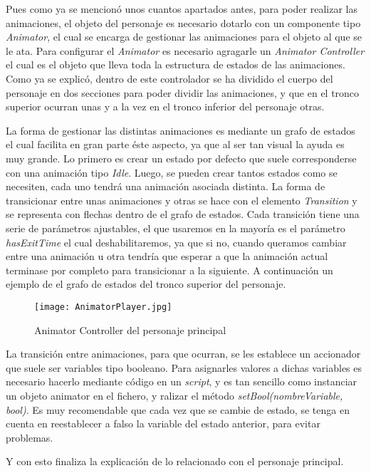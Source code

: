 Pues como ya se mencionó unos cuantos apartados antes, para poder realizar las animaciones, el objeto del personaje es necesario dotarlo con un componente tipo \textit{Animator}, el cual se encarga de gestionar las animaciones para el objeto al que se le ata. Para configurar el \textit{Animator} es necesario agragarle un \textit{Animator Controller} el cual es el objeto que lleva toda la estructura de estados de las animaciones. Como ya se explicó, dentro de este controlador se ha dividido el cuerpo del personaje en dos secciones para poder dividir las animaciones, y que en el tronco superior ocurran unas y a la vez en el tronco inferior del personaje otras.

La forma de gestionar las distintas animaciones es mediante un grafo de estados el cual facilita en gran parte éste aspecto, ya que al ser tan visual la ayuda es muy grande. Lo primero es crear un estado por defecto que suele corresponderse con una animación tipo \textit{Idle}. Luego, se pueden crear tantos estados como se necesiten, cada uno tendrá una animación asociada distinta. La forma de transicionar entre unas animaciones y otras se hace con el elemento \textit{Transition} y se representa con flechas dentro de el grafo de estados. Cada transición tiene una serie de parámetros ajustables, el que usaremos en la mayoría es el parámetro \textit{hasExitTime} el cual deshabilitaremos, ya que si no, cuando queramos cambiar entre una animación u otra tendría que esperar a que la animación actual terminase por completo para transicionar a la siguiente. A continuación un ejemplo de el grafo de estados del tronco superior del personaje.

\begin{figure}[H]
    \centering
    \texttt{[image: AnimatorPlayer.jpg]}
    \caption{Animator Controller del personaje principal}
\end{figure}

La transición entre animaciones, para que ocurran, se les establece un accionador que suele ser variables tipo booleano. Para asignarles valores a dichas variables es necesario hacerlo mediante código en un \textit{script}, y es tan sencillo como instanciar un objeto animator en el fichero, y ralizar el método \textit{setBool(nombreVariable, bool)}. Es muy recomendable que cada vez que se cambie de estado, se tenga en cuenta en reestablecer a falso la variable del estado anterior, para evitar problemas.

Y con esto finaliza la explicación de lo relacionado con el personaje principal. 

